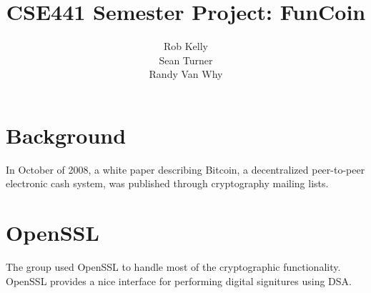 \documentclass[12pt]{article}
\begin{document}
\title{CSE441 Semester Project: FunCoin}
\author{Rob Kelly\\Sean Turner\\Randy Van Why}
\maketitle

\section{Background}
In October of 2008, a white paper\cite{nakamoto:bitcoin} describing Bitcoin, a decentralized peer-to-peer electronic cash system, was published through cryptography mailing lists.

\section{OpenSSL}
The group used OpenSSL to handle most of the cryptographic functionality. OpenSSL provides a nice interface for performing digital signitures using DSA.



\end{document}

